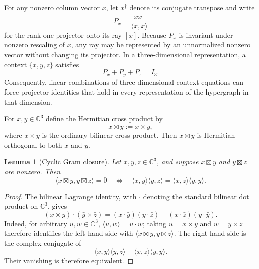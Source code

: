 \documentclass[twocolumn,aps,pra,floatfix,amsmath,amssymb,longbibliography]{revtex4-2}
\newtheorem{lemma}[theorem]{Lemma}
\theoremstyle{definition}
\theoremstyle{remark}
\newcommand{\C}{\mathbb C}
\begin{document}
For any nonzero column vector $x$, let $x^\dagger$ denote its conjugate
transpose and write
\begin{equation}
 P_x=\frac{xx^\dagger}{\langle x,x\rangle}
 \label{eq:projector}
\end{equation}
for the rank-one projector onto its ray $[x]$.  Because $P_x$ is invariant
under nonzero rescaling of $x$, any ray may be represented by an unnormalized
nonzero vector without changing its projector.  In a three-dimensional
representation, a context $\{x,y,z\}$ satisfies
\begin{equation}
 P_x+P_y+P_z=I_3.
 \label{eq:context-sum}
\end{equation}
Consequently, linear combinations of three-dimensional context equations can
force projector identities that hold in every representation of the hypergraph
in that dimension.

For $x,y\in\C^3$ define the Hermitian cross product by
\begin{equation}
 x\boxtimes y:=\overline{x\times y},
 \label{eq:hcross}
\end{equation}
where $x\times y$ is the ordinary bilinear cross product.  Then
$x\boxtimes y$ is Hermitian-orthogonal to both $x$ and $y$.

\begin{lemma}[Cyclic Gram closure]
\label{lem:gram-closure}
Let $x,y,z\in\C^3$, and suppose $x\boxtimes y$ and
$y\boxtimes z$ are nonzero.  Then
\begin{equation}
 \langle x\boxtimes y,y\boxtimes z\rangle=0
 \quad\Longleftrightarrow\quad
 \langle x,y\rangle\langle y,z\rangle
 =\langle x,z\rangle\langle y,y\rangle.
 \label{eq:gram-closure}
\end{equation}
\end{lemma}

\begin{proof}
The bilinear Lagrange identity, with $\mathbin{\cdot}$ denoting the standard
bilinear dot product on $\C^3$, gives
\[
 (x\times y)\mathbin{\cdot}(\bar y\times\bar z)
 =(x\mathbin{\cdot}\bar y)(y\mathbin{\cdot}\bar z)
 -(x\mathbin{\cdot}\bar z)(y\mathbin{\cdot}\bar y).
\]
Indeed, for arbitrary $u,w\in\C^3$,
$\langle\bar u,\bar w\rangle=u\mathbin{\cdot}\bar w$; taking
$u=x\times y$ and $w=y\times z$ therefore identifies the left-hand side
with $\langle x\boxtimes y,y\boxtimes z\rangle$.  The right-hand side
is the complex conjugate of
\[
 \langle x,y\rangle\langle y,z\rangle
 -\langle x,z\rangle\langle y,y\rangle.
\]
Their vanishing is therefore equivalent.
\end{proof}
\end{document}
